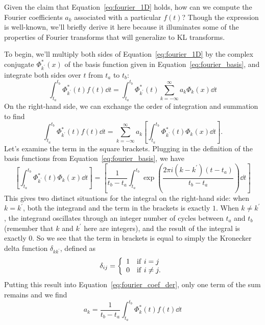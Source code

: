Given the claim that Equation~\ref{eq:fourier_1D} holds, how can we
compute the Fourier coefficients $a_k$ associated with 
a particular $f(t)$?  Though the expression is well-known, we'll briefly
derive it here because it illuminates some of the properties of
Fourier transforms that will generalize to KL transforms.

To begin, we'll multiply both sides of Equation~\ref{eq:fourier_1D} by the
complex conjugate $\Phi^\ast_{k^\prime}(x)$ of the basis function given
in Equation~\ref{eq:fourier_basis}, and integrate both sides over $t$
from $t_a$ to $t_b$:
\begin{equation}
  \int_{t_a}^{t_b} \Phi^\ast_{k^\prime}(t) f(t) \dd t
  = \int_{t_a}^{t_b} \Phi^\ast_{k^\prime}(t) \sum_{k=-\infty}^\infty a_k\Phi_k(x)\dd t
\end{equation}
On the right-hand side, we can exchange the order of integration and
summation to find 
\begin{equation}
  \label{eq:fourier_coef_der}
  \int_{t_a}^{t_b} \Phi^\ast_{k^\prime}(t) f(t) \dd t
  =  \sum_{k=-\infty}^\infty a_k \left[\int_{t_a}^{t_b} \Phi^\ast_{k^\prime}(t)\Phi_k(x)\dd t\right].
\end{equation}
Let's examine the term in the square brackets.  Plugging in the definition
of the basis functions from Equation~\ref{eq:fourier_basis}, we have
\begin{equation}
  \left[\int_{t_a}^{t_b} \Phi^\ast_{k^\prime}(t)\Phi_k(x)\dd t\right]
  = \left[\frac{1}{t_b-t_a}\int_{t_a}^{t_b} \exp\left(\frac{2\pi i (k - k^\prime) (t-t_a)}
    {t_b - t_a}\right)\dd t\right]
\end{equation}
This gives two distinct situations for the integral on the right-hand side:
when $k=k^\prime$, both the integrand 
and the term in the brackets is exactly $1$.  When $k\ne k^\prime$,
the integrand oscillates through an integer number of cycles between
$t_a$ and $t_b$ (remember that $k$ and $k^\prime$ here are integers),
and the result of the integral is exactly $0$.
So we see that the term in brackets is equal to simply 
the Kronecker delta function $\delta_{kk^\prime}$, defined as
\begin{equation}
  \delta_{ij} = \left\{
  \begin{array}{ll}
    1 & {\rm if}\ i = j\\
    0 & {\rm if}\ i \ne j.
  \end{array}
  \right.
\end{equation}
Putting this result into Equation~\ref{eq:fourier_coef_der}, only one
term of the sum remains and we find
\begin{equation}
  \label{eq:fourier_coef}
  a_k = \frac{1}{t_b - t_a}\int_{t_a}^{t_b} \Phi^\ast_k(t) f(t) \dd t
\end{equation}

